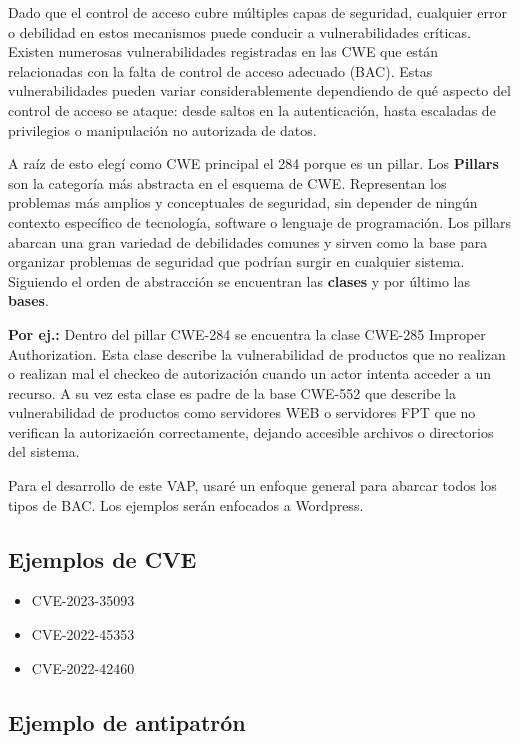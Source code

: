 Dado que el control de acceso cubre múltiples capas de seguridad, cualquier error o debilidad en estos mecanismos puede conducir a vulnerabilidades críticas. Existen numerosas vulnerabilidades registradas en las CWE que están relacionadas con la falta de control de acceso adecuado (BAC). Estas vulnerabilidades pueden variar considerablemente dependiendo de qué aspecto del control de acceso se ataque: desde saltos en la autenticación, hasta escaladas de privilegios o manipulación no autorizada de datos.

A raíz de esto elegí como CWE principal el 284 porque es un pillar. Los \textbf{Pillars }son la categoría más abstracta en el esquema de CWE. Representan los problemas más amplios y conceptuales de seguridad, sin depender de ningún contexto específico de tecnología, software o lenguaje de programación. Los pillars abarcan una gran variedad de debilidades comunes y sirven como la base para organizar problemas de seguridad que podrían surgir en cualquier sistema. Siguiendo el orden de abstracción se encuentran las \textbf{clases} y por último las \textbf{bases}. 

\textbf{Por ej.:} Dentro del pillar CWE-284 se encuentra la clase CWE-285 Improper Authorization. Esta clase describe la vulnerabilidad de productos que no realizan o realizan mal el checkeo de autorización cuando un actor intenta acceder a un recurso. A su vez esta clase es padre de la base CWE-552 que describe la vulnerabilidad de productos como servidores WEB o servidores FPT que no verifican la autorización correctamente, dejando accesible archivos o directorios del sistema.

Para el desarrollo de este VAP, usaré un enfoque general para abarcar todos los tipos de BAC. Los ejemplos serán enfocados a Wordpress.

\subsection*{Ejemplos de CVE}

\begin{itemize}
    \item CVE-2023-35093
    \item CVE-2022-45353
    \item CVE-2022-42460
\end{itemize}

\subsection*{Ejemplo de antipatrón}

